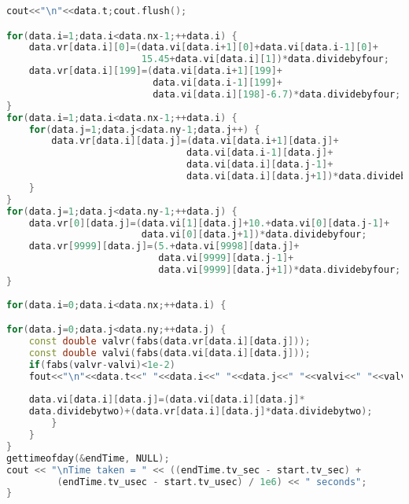 \documentclass[10pt]{report}
\begin{document}
\begin{lstlisting}[language=C++, caption=Optimized code listing]
cout<<"\n"<<data.t;cout.flush();                                          

for(data.i=1;data.i<data.nx-1;++data.i) {
    data.vr[data.i][0]=(data.vi[data.i+1][0]+data.vi[data.i-1][0]+
                        15.45+data.vi[data.i][1])*data.dividebyfour;
    data.vr[data.i][199]=(data.vi[data.i+1][199]+
                          data.vi[data.i-1][199]+
                          data.vi[data.i][198]-6.7)*data.dividebyfour;
}
for(data.i=1;data.i<data.nx-1;++data.i) {
    for(data.j=1;data.j<data.ny-1;data.j++) {
        data.vr[data.i][data.j]=(data.vi[data.i+1][data.j]+
                                data.vi[data.i-1][data.j]+
                                data.vi[data.i][data.j-1]+
                                data.vi[data.i][data.j+1])*data.dividebyfour;
    }
}
for(data.j=1;data.j<data.ny-1;++data.j) {
    data.vr[0][data.j]=(data.vi[1][data.j]+10.+data.vi[0][data.j-1]+
                        data.vi[0][data.j+1])*data.dividebyfour;
    data.vr[9999][data.j]=(5.+data.vi[9998][data.j]+
                           data.vi[9999][data.j-1]+
                           data.vi[9999][data.j+1])*data.dividebyfour;
}
                
for(data.i=0;data.i<data.nx;++data.i) {

for(data.j=0;data.j<data.ny;++data.j) {                                 
    const double valvr(fabs(data.vr[data.i][data.j]));
    const double valvi(fabs(data.vi[data.i][data.j]));
    if(fabs(valvr-valvi)<1e-2) 
    fout<<"\n"<<data.t<<" "<<data.i<<" "<<data.j<<" "<<valvi<<" "<<valvr;
 
    data.vi[data.i][data.j]=(data.vi[data.i][data.j]*
    data.dividebytwo)+(data.vr[data.i][data.j]*data.dividebytwo);
        }
    }
}
gettimeofday(&endTime, NULL);
cout << "\nTime taken = " << ((endTime.tv_sec - start.tv_sec) +
         (endTime.tv_usec - start.tv_usec) / 1e6) << " seconds";
}
\end{lstlisting}
\end{document}
